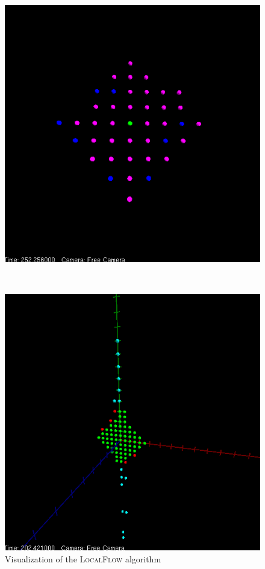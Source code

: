 \begin{figure}[ht]
	\centering
	\begin{minipage}[t]{0.46\textwidth}
		\centering
		\includegraphics[width=\textwidth]{chapter_whatitis_fig/local-flow}
		\caption{Visualization of the \textsc{LocalFlow} algorithm}
		\label{WII:fig:local-flow}
	\end{minipage}$\quad$
	\begin{minipage}[t]{0.46\textwidth}
		\centering
		\includegraphics[width=\textwidth]{chapter_whatitis_fig/gridpullspin2d.png}

\end{minipage}
\end{figure}
